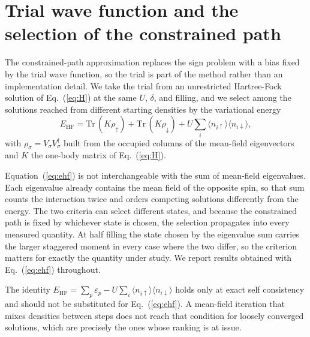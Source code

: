 \documentclass[aps,prb,reprint,superscriptaddress,amsmath,amssymb,floatfix]{revtex4-2}
\begin{document}
\appendix

\section{Trial wave function and the selection of the constrained path}
\label{app:trial}

The constrained-path approximation replaces the sign problem with a bias fixed by
the trial wave function, so the trial is part of the method rather than an
implementation detail. We take the trial from an unrestricted Hartree-Fock
solution of Eq.~(\ref{eq:H}) at the same $U$, $\delta$, and filling, and we select
among the solutions reached from different starting densities by the variational
energy
\begin{equation}
E_{\mathrm{HF}} = \mathrm{Tr}\,(K \rho_{\uparrow}) + \mathrm{Tr}\,(K \rho_{\downarrow})
                + U \sum_i \langle n_{i\uparrow}\rangle \langle n_{i\downarrow}\rangle ,
\label{eq:ehf}
\end{equation}
with $\rho_{\sigma} = V_{\sigma} V_{\sigma}^{\dagger}$ built from the occupied
columns of the mean-field eigenvectors and $K$ the one-body matrix of
Eq.~(\ref{eq:H}).

Equation~(\ref{eq:ehf}) is not interchangeable with the sum of mean-field
eigenvalues. Each eigenvalue already contains the mean field of the opposite
spin, so that sum counts the interaction twice and orders competing solutions
differently from the energy. The two criteria can select different states, and
because the constrained path is fixed by whichever state is chosen, the selection
propagates into every measured quantity. At half filling the state chosen by the
eigenvalue sum carries the larger staggered moment in every case where the two
differ, so the criterion matters for exactly the quantity under study. We report
results obtained with Eq.~(\ref{eq:ehf}) throughout.

The identity
$E_{\mathrm{HF}} = \sum_p \varepsilon_p - U \sum_i \langle n_{i\uparrow}\rangle
\langle n_{i\downarrow}\rangle$
holds only at exact self consistency and should not be substituted for
Eq.~(\ref{eq:ehf}). A mean-field iteration that mixes densities between steps does
not reach that condition for loosely converged solutions, which are precisely the
ones whose ranking is at issue.

\end{document}
